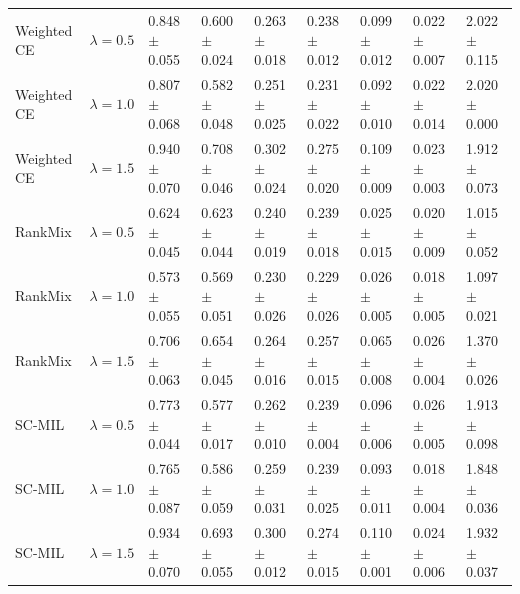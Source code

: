 \begin{tabular}{lllllllll}
Weighted CE & $\lambda=0.5$ & \num{0.848} $\pm$ \num{0.055} & \num{0.600} $\pm$ \num{0.024} & \num{0.263} $\pm$ \num{0.018} & \num{0.238} $\pm$ \num{0.012} & \num{0.099} $\pm$ \num{0.012} & \num{0.022} $\pm$ \num{0.007} & \num{2.022} $\pm$ \num{0.115}\\
Weighted CE & $\lambda=1.0$ & \num{0.807} $\pm$ \num{0.068} & \num{0.582} $\pm$ \num{0.048} & \num{0.251} $\pm$ \num{0.025} & \num{0.231} $\pm$ \num{0.022} & \num{0.092} $\pm$ \num{0.010} & \num{0.022} $\pm$ \num{0.014} & \num{2.020} $\pm$ \num{0.000}\\
Weighted CE & $\lambda=1.5$ & \num{0.940} $\pm$ \num{0.070} & \num{0.708} $\pm$ \num{0.046} & \num{0.302} $\pm$ \num{0.024} & \num{0.275} $\pm$ \num{0.020} & \num{0.109} $\pm$ \num{0.009} & \num{0.023} $\pm$ \num{0.003} & \num{1.912} $\pm$ \num{0.073}\\
RankMix & $\lambda=0.5$ & \num{0.624} $\pm$ \num{0.045} & \num{0.623} $\pm$ \num{0.044} & \num{0.240} $\pm$ \num{0.019} & \num{0.239} $\pm$ \num{0.018} & \num{0.025} $\pm$ \num{0.015} & \num{0.020} $\pm$ \num{0.009} & \num{1.015} $\pm$ \num{0.052}\\
RankMix & $\lambda=1.0$ & \num{0.573} $\pm$ \num{0.055} & \num{0.569} $\pm$ \num{0.051} & \num{0.230} $\pm$ \num{0.026} & \num{0.229} $\pm$ \num{0.026} & \num{0.026} $\pm$ \num{0.005} & \num{0.018} $\pm$ \num{0.005} & \num{1.097} $\pm$ \num{0.021}\\
RankMix & $\lambda=1.5$ & \num{0.706} $\pm$ \num{0.063} & \num{0.654} $\pm$ \num{0.045} & \num{0.264} $\pm$ \num{0.016} & \num{0.257} $\pm$ \num{0.015} & \num{0.065} $\pm$ \num{0.008} & \num{0.026} $\pm$ \num{0.004} & \num{1.370} $\pm$ \num{0.026}\\
SC-MIL & $\lambda=0.5$ & \num{0.773} $\pm$ \num{0.044} & \num{0.577} $\pm$ \num{0.017} & \num{0.262} $\pm$ \num{0.010} & \num{0.239} $\pm$ \num{0.004} & \num{0.096} $\pm$ \num{0.006} & \num{0.026} $\pm$ \num{0.005} & \num{1.913} $\pm$ \num{0.098}\\
SC-MIL & $\lambda=1.0$ & \num{0.765} $\pm$ \num{0.087} & \num{0.586} $\pm$ \num{0.059} & \num{0.259} $\pm$ \num{0.031} & \num{0.239} $\pm$ \num{0.025} & \num{0.093} $\pm$ \num{0.011} & \num{0.018} $\pm$ \num{0.004} & \num{1.848} $\pm$ \num{0.036}\\
SC-MIL & $\lambda=1.5$ & \num{0.934} $\pm$ \num{0.070} & \num{0.693} $\pm$ \num{0.055} & \num{0.300} $\pm$ \num{0.012} & \num{0.274} $\pm$ \num{0.015} & \num{0.110} $\pm$ \num{0.001} & \num{0.024} $\pm$ \num{0.006} & \num{1.932} $\pm$ \num{0.037}\\
\bottomrule
\end{tabular}
